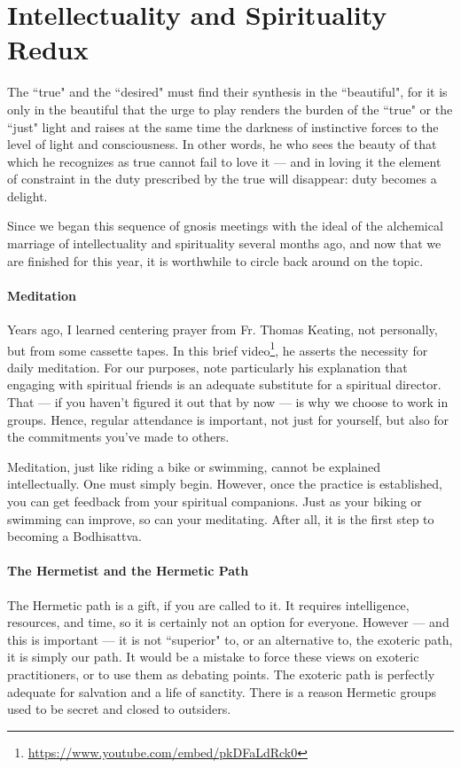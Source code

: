 \section{Intellectuality and Spirituality Redux}

\begin{quotex}
The ``true" and the ``desired" must find their synthesis in the ``beautiful", for it is only in the beautiful that the urge to play renders the burden of the ``true" or the ``just" light and raises at the same time the darkness of instinctive forces to the level of light and consciousness. In other words, he who sees the beauty of that which he recognizes as true cannot fail to love it — and in loving it the element of constraint in the duty prescribed by the true will disappear: duty becomes a delight. 

\end{quotex}
Since we began this sequence of gnosis meetings with the ideal of the alchemical marriage of intellectuality and spirituality several months ago, and now that we are finished for this year, it is worthwhile to circle back around on the topic.

\paragraph{Meditation}
Years ago, I learned centering prayer from Fr. Thomas Keating, not personally, but from some cassette tapes. In this brief video\footnote{\url{https://www.youtube.com/embed/pkDFaLdRck0}}, he asserts the necessity for daily meditation. For our purposes, note particularly his explanation that engaging with spiritual friends is an adequate substitute for a spiritual director. That — if you haven't figured it out that by now — is why we choose to work in groups. Hence, regular attendance is important, not just for yourself, but also for the commitments you've made to others.

Meditation, just like riding a bike or swimming, cannot be explained intellectually. One must simply begin. However, once the practice is established, you can get feedback from your spiritual companions. Just as your biking or swimming can improve, so can your meditating. After all, it is the first step to becoming a Bodhisattva.

\paragraph{The Hermetist and the Hermetic Path}
The Hermetic path is a gift, if you are called to it. It requires intelligence, resources, and time, so it is certainly not an option for everyone. However — and this is important — it is not ``superior" to, or an alternative to, the exoteric path, it is simply our path. It would be a mistake to force these views on exoteric practitioners, or to use them as debating points. The exoteric path is perfectly adequate for salvation and a life of sanctity. There is a reason Hermetic groups used to be secret and closed to outsiders.


